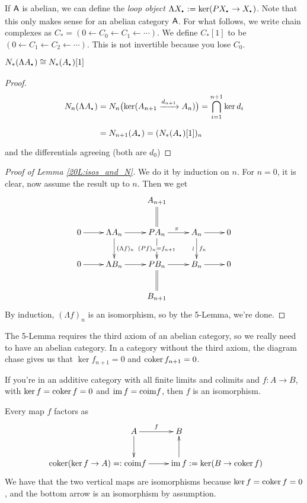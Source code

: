 If $\text{\sf A}$ is abelian, we can define the \emph{loop object} $\Lambda X_\udot:=\ker (PX_\udot \to X_\udot)$. Note that this only makes sense for an abelian category $\text{\sf A}$. For what follows, we write chain complexes as $C_*=(0\leftarrow C_0 \leftarrow C_1 \leftarrow\cdots)$. We define $C_*[1]$ to be $(0\leftarrow C_1 \leftarrow C_2 \leftarrow\cdots)$. This is not invertible because you lose $C_0$.
\begin{lemma}
 $N_*(\Lambda A_\udot)\cong N_*(A_\udot)[1]$
\end{lemma}
\begin{proof}\ \vspace{-\baselineskip}
 \begin{align*}
 N_n(\Lambda A_\udot) &= N_n\bigl(\ker(A_{n+1}\xrightarrow{d_{n+1}}A_n)\bigr) 
 = \bigcap_{i=1}^{n+1} \ker d_i \\
 &= N_{n+1}(A_\udot)=(N_*(A_\udot)[1])_n
 \end{align*}
 and the differentials agreeing (both are $d_0$)
\end{proof}
\begin{proof}[Proof of Lemma \ref{20L:isos_and_N}]
 We do it by induction on $n$. For $n=0$, it is clear, now assume the result up to $n$. Then we get
 \[\xymatrix{
  & & A_{n+1}\ar@{=}[d]\\
  0\ar[r] & \Lambda A_n\ar[d]^{(\Lambda f)_n} \ar[r] & PA_n\ar[r]^\pi \ar[d]|{(Pf)_n=f_{n+1}} & A_n\ar[r]\ar[d]^{f_n}_\wr & 0\\
  0\ar[r] & \Lambda B_n \ar[r] & PB_n \ar[r] & B_n\ar[r] & 0\\
  & & B_{n+1}\ar@{=}[u]
 }\]
 By induction, $(\Lambda f)_n$ is an isomorphism, so by the 5-Lemma, we're done.
\end{proof}
\begin{remark}
 The 5-Lemma requires the third axiom of an abelian category, so we really need to have an abelian category. In a category without the third axiom, the diagram chase gives us that $\ker f_{n+1}=0$ and $\operatorname{coker} f_{n+1}=0$.
\end{remark}
\begin{lemma}
 If you're in an additive category with all finite limits and colimits and $f\colon A\to B$, with $\ker f=\operatorname{coker} f=0$ and $\operatorname{im} f=\mathrm{coim} f$, then $f$ is an isomorphism.
\end{lemma}
Every map $f$ factors as
\[\xymatrix{
 A\ar[r]^f\ar[d] & B\\\
 \llap{$\coker(\ker f\to A)=:\;$}\mathrm{coim} f\ar[r] & \im f\rlap{$\;:=\ker(B\to \coker f)$}\ar[u]
}\]
We have that the two vertical maps are isomorphisms because $\ker f=\operatorname{coker} f=0$, and the bottom arrow is an isomorphism by assumption.

